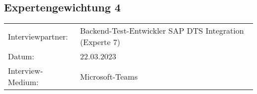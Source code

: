 \newpage
\subsection{Expertengewichtung 4}
        \begin{tabular}{ l l }
    Interviewpartner: & Backend-Test-Entwickler SAP DTS Integration (Experte 7)\\
    Datum: & 22.03.2023\\
    Interview-Medium: & Microsoft-Teams\\
\end{tabular}
\begin{center}
\begin{figure}[H]
    \centering
    \label{fig:gew_41}
\end{figure}	
\end{center}
\begin{center}
\begin{figure}[H]
    \centering
    \label{fig:gew_42}
\end{figure}	
\end{center}

